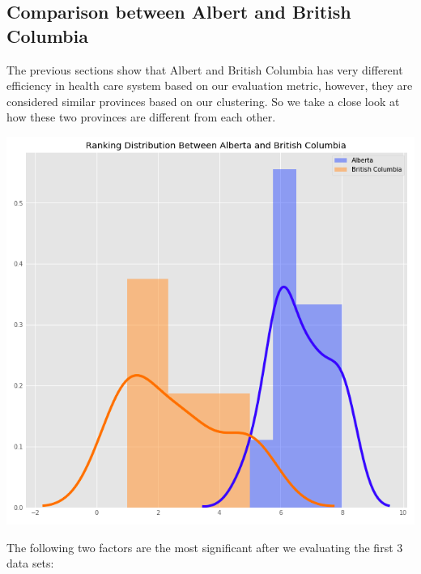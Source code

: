 \documentclass[preprint,12pt]{elsarticle}
\begin{document}
\subsection{Comparison between Albert and British Columbia}
The previous sections show that Albert and British Columbia has very different efficiency in health care system based on our evaluation metric, however, they are considered similar provinces based on our clustering. So we take a close look at how these two provinces are different from each other.\\
\begin{center}
\includegraphics[scale=0.3]{images/albertabccompare.png}
\end{center}
The following two factors are the most significant after we evaluating the first 3 data sets:
\end{document}
